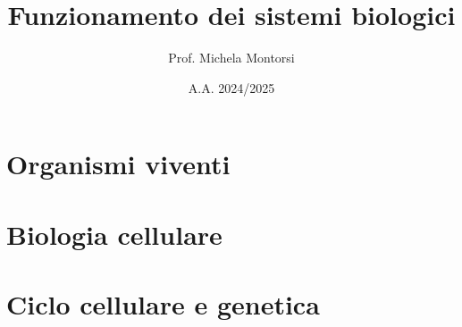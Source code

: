 \documentclass[11pt, oneside, openany]{book}
\title{Funzionamento dei sistemi biologici}
\author{Prof. Michela Montorsi}
\date{A.A. 2024/2025}
\begin{document}
\frontmatter                 %

\maketitle
\thispagestyle{empty}
\clearpage

\tableofcontents
\clearpage

\mainmatter                  %

\chapter{Organismi viventi}






\chapter{Biologia cellulare}







\chapter{Ciclo cellulare e genetica}





\end{document}
